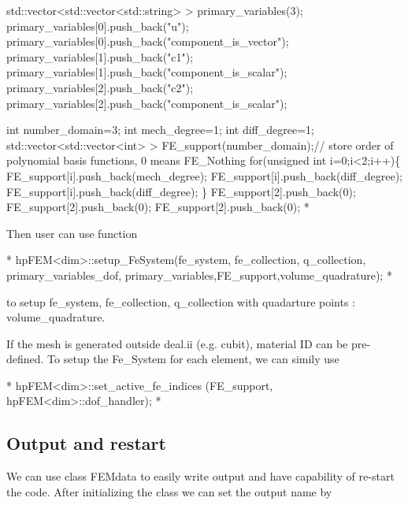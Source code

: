 \begin{DoxyCode}
       std::vector<std::vector<std::string> > primary\_variables(3);        
       primary\_variables[0].push\_back(\textcolor{stringliteral}{"u"}); primary\_variables[0].push\_back(\textcolor{stringliteral}{"component\_is\_vector"});
       primary\_variables[1].push\_back(\textcolor{stringliteral}{"c1"}); primary\_variables[1].push\_back(\textcolor{stringliteral}{"component\_is\_scalar"});
       primary\_variables[2].push\_back(\textcolor{stringliteral}{"c2"}); primary\_variables[2].push\_back(\textcolor{stringliteral}{"component\_is\_scalar"});
       
       \textcolor{keywordtype}{int} number\_domain=3;
       \textcolor{keywordtype}{int} mech\_degree=1;
       \textcolor{keywordtype}{int} diff\_degree=1;
       std::vector<std::vector<int> > FE\_support(number\_domain);\textcolor{comment}{// store order of polynomial basis
       functions, 0 means FE\_Nothing   }
       \textcolor{keywordflow}{for}(\textcolor{keywordtype}{unsigned} \textcolor{keywordtype}{int} i=0;i<2;i++)\{
           FE\_support[i].push\_back(mech\_degree);
           FE\_support[i].push\_back(diff\_degree);
           FE\_support[i].push\_back(diff\_degree);
       \}
       FE\_support[2].push\_back(0);
       FE\_support[2].push\_back(0);
       FE\_support[2].push\_back(0);
*
\end{DoxyCode}
 Then user can use function 
\begin{DoxyCode}
 *  hpFEM<dim>::setup_FeSystem(fe\_system, fe\_collection, q\_collection, primary\_variables\_dof,
      primary\_variables,FE\_support,volume\_quadrature);
* 
\end{DoxyCode}
 to setup {\ttfamily fe\-\_\-system}, {\ttfamily fe\-\_\-collection}, {\ttfamily q\-\_\-collection} with quadarture points \-: {\ttfamily volume\-\_\-quadrature}.\par
 If the mesh is generated outside deal.\-ii (e.\-g. cubit), material I\-D can be pre-\/defined. To setup the {\ttfamily Fe\-\_\-\-System} for each element, we can simily use 
\begin{DoxyCode}
 *  hpFEM<dim>::set_active_fe_indices (FE\_support, hpFEM<dim>::dof_handler);
* 
\end{DoxyCode}
 \hypertarget{brain_morph_outPut}{}\subsection{Output and restart}\label{brain_morph_outPut}
We can use class {\ttfamily F\-E\-Mdata} to easily write output and have capability of re-\/start the code. After initializing the class we can set the output name by 
